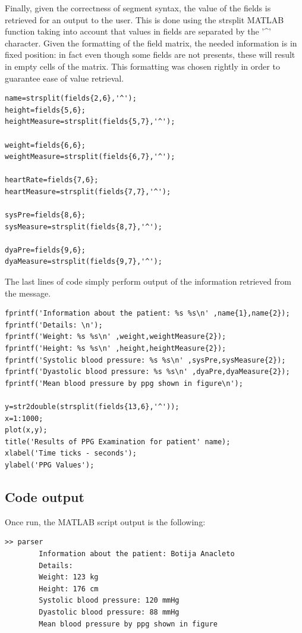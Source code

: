 \documentclass[a4paper,titlepage]{article}
\begin{document}
Finally, given the correctness of segment syntax, the value of the fields is retrieved for an output to the user.
This is done using the strsplit MATLAB function taking into account that values in fields are separated by the '\textasciicircum' character.
Given the formatting of the field matrix, the needed information is in fixed position: in fact even though some fields are not presents, these will result in empty cells of the matrix. This formatting was chosen rightly in order to guarantee ease of value retrieval. 
\begin{lstlisting}[caption=Information Retrieval]
name=strsplit(fields{2,6},'^');
height=fields{5,6};
heightMeasure=strsplit(fields{5,7},'^');

weight=fields{6,6};
weightMeasure=strsplit(fields{6,7},'^');

heartRate=fields{7,6};
heartMeasure=strsplit(fields{7,7},'^');

sysPre=fields{8,6};
sysMeasure=strsplit(fields{8,7},'^');

dyaPre=fields{9,6};
dyaMeasure=strsplit(fields{9,7},'^');
\end{lstlisting}

The last lines of code simply perform output of the information retrieved from the message.
\begin{lstlisting}[caption=Information Retrieval]
fprintf('Information about the patient: %s %s\n' ,name{1},name{2}); 
fprintf('Details: \n');
fprintf('Weight: %s %s\n' ,weight,weightMeasure{2}); 
fprintf('Height: %s %s\n' ,height,heightMeasure{2}); 
fprintf('Systolic blood pressure: %s %s\n' ,sysPre,sysMeasure{2}); 
fprintf('Dyastolic blood pressure: %s %s\n' ,dyaPre,dyaMeasure{2}); 
fprintf('Mean blood pressure by ppg shown in figure\n'); 

y=str2double(strsplit(fields{13,6},'^'));
x=1:1000;
plot(x,y);
title('Results of PPG Examination for patient' name);
xlabel('Time ticks - seconds');
ylabel('PPG Values');
\end{lstlisting}

\subsection{Code output}
Once run, the MATLAB script output is the following:
\begin{lstlisting}[caption=Parser Output]
>> parser
		Information about the patient: Botija Anacleto
		Details: 
		Weight: 123 kg
		Height: 176 cm
		Systolic blood pressure: 120 mmHg
		Dyastolic blood pressure: 88 mmHg
		Mean blood pressure by ppg shown in figure
\end{lstlisting}
\end{document}
